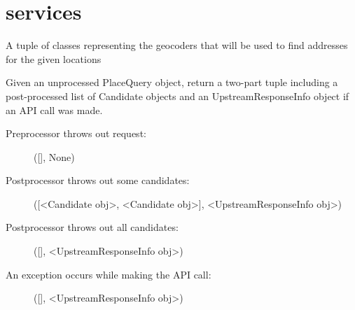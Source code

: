 \documentclass[letterpaper,10pt,english]{sphinxmanual}
\begin{document}
\chapter{services}
\label{index:services}\label{index:module-omgeo.services.base}

\begin{fulllineitems}
\label{index:omgeo.services.base.GeocodeService}
A tuple of classes representing the geocoders that will be used
to find addresses for the given locations

\begin{fulllineitems}
\label{index:omgeo.services.base.GeocodeService.geocode}
Given an unprocessed PlaceQuery object, return a two-part tuple
including a post-processed list of Candidate objects 
and an UpstreamResponseInfo object if an API call was made.
\begin{description}
\item[{Preprocessor throws out request:}] \leavevmode
({[}{]}, None)

\item[{Postprocessor throws out some candidates:}] \leavevmode
({[}\textless{}Candidate obj\textgreater{}, \textless{}Candidate obj\textgreater{}{]}, \textless{}UpstreamResponseInfo obj\textgreater{})

\item[{Postprocessor throws out all candidates:}] \leavevmode
({[}{]}, \textless{}UpstreamResponseInfo obj\textgreater{})

\item[{An exception occurs while making the API call:}] \leavevmode
({[}{]}, \textless{}UpstreamResponseInfo obj\textgreater{})

\end{description}

\end{fulllineitems}


\end{fulllineitems}

\end{document}
